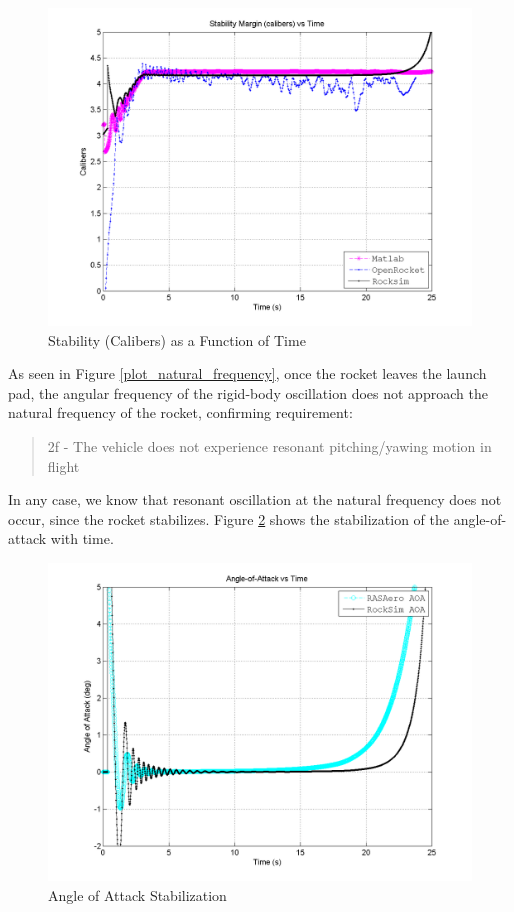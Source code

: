 \documentclass[]{book}
\begin{document}
\begin{figure}[htbp]
\centering
\includegraphics{images/plots/error_stability_calibers_plot.png}
\caption{Stability (Calibers) as a Function of Time
\label{error_stability_calibers_plot_label}}
\end{figure}

\clearpage
As seen in Figure \ref{plot_natural_frequency}, once the rocket leaves
the launch pad, the angular frequency of the rigid-body oscillation does
not approach the natural frequency of the rocket, confirming
requirement:

\begin{quote}
2f - The vehicle does not experience resonant pitching/yawing motion in
flight
\end{quote}

In any case, we know that resonant oscillation at the natural frequency
does not occur, since the rocket stabilizes. Figure
\ref{error_stability_response} shows the stabilization of the
angle-of-attack with time.

\begin{figure}[htbp]
\centering
\includegraphics{images/plots/error_aoa_plot.png}
\caption{Angle of Attack Stabilization \label{error_stability_response}}
\end{figure}
\end{document}

